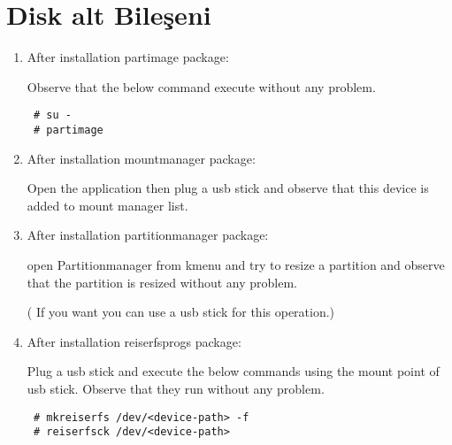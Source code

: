 \documentclass[a4paper,10pt]{article}
\begin{document}
\section{Disk alt Bileşeni}
\begin{enumerate}
 \item After installation partimage package:

Observe that the below command execute without any problem.
\begin{verbatim}
 # su -
 # partimage
\end{verbatim}


 \item After installation mountmanager package:

Open the application then plug a usb stick and observe that this device is added to mount manager list.

 \item After installation partitionmanager package:

open Partitionmanager from kmenu and try to resize a partition and observe that the partition is resized without any problem.

( If you want you can use a usb stick for this operation.)

\item After installation reiserfsprogs package:

Plug a usb stick and execute the below commands using the mount point of usb stick. Observe that they run without any problem.

\begin{verbatim}
 # mkreiserfs /dev/<device-path> -f
 # reiserfsck /dev/<device-path>
\end{verbatim}

\end{enumerate}
\end{document}
